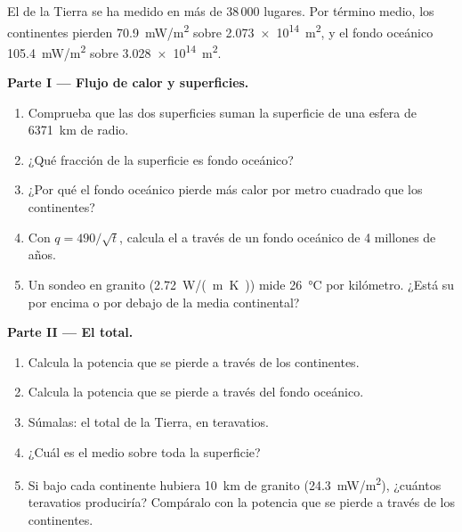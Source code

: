 \begin{problem}
\label{pb:g12:internal-heat:1}
El  de la Tierra se ha medido en más de 38\,000 lugares. Por
término medio, los continentes pierden \qty{70.9}{mW/m^2} sobre
\qty{2.073e14}{m^2}, y el fondo oceánico \qty{105.4}{mW/m^2} sobre
\qty{3.028e14}{m^2}.

\medskip
\noindent\textbf{Parte I --- Flujo de calor y superficies.}
\begin{enumerate}
  \item Comprueba que las dos superficies suman la superficie de una esfera
        de \qty{6371}{km} de radio.
  \item ¿Qué fracción de la superficie es fondo oceánico?
  \item ¿Por qué el fondo oceánico pierde más calor por metro cuadrado que los
        continentes?
  \item Con $q = 490/\sqrt{t}$, calcula el  a través de un
        fondo oceánico de 4 millones de años.
  \item Un sondeo en granito (\qty{2.72}{W/(m.K)}) mide \qty{26}{\celsius}
        por kilómetro. ¿Está su  por encima o por debajo de la
        media continental?
\end{enumerate}

\medskip
\noindent\textbf{Parte II --- El total.}
\begin{enumerate}[resume]
  \item Calcula la potencia que se pierde a través de los continentes.
  \item Calcula la potencia que se pierde a través del fondo oceánico.
  \item Súmalas: el  total de la Tierra, en teravatios.
  \item ¿Cuál es el  medio sobre toda la superficie?
  \item Si bajo cada continente hubiera \qty{10}{km} de granito
        (\qty{24.3}{mW/m^2}), ¿cuántos teravatios produciría? Compáralo con la
        potencia que se pierde a través de los continentes.
\end{enumerate}


\end{problem}
